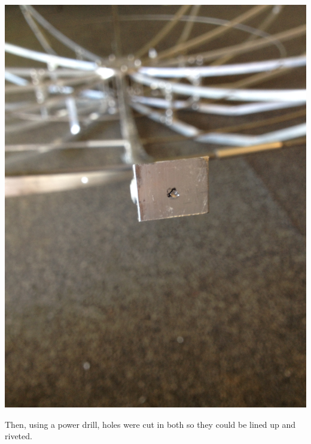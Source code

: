 \documentclass[11pt]{article} %
\begin{document}
\begin{center}
\includegraphics[scale=0.12]{dish/05.jpeg}
\end{center}

Then, using a power drill, holes were cut in both so they could be lined up and riveted.
\end{document}
